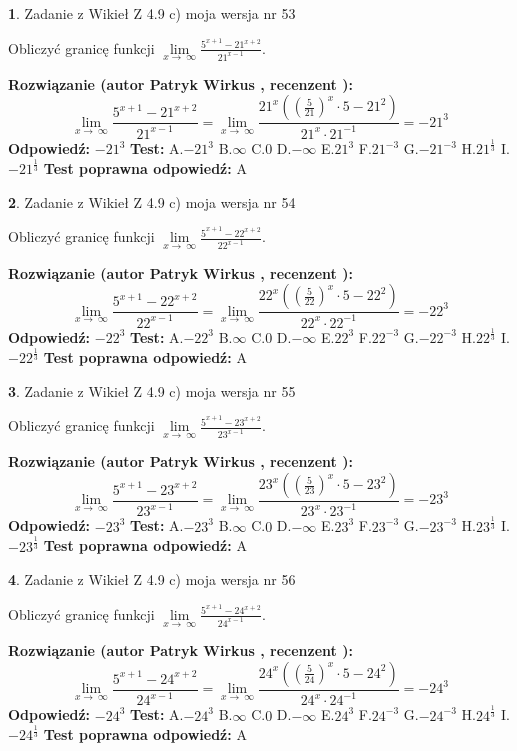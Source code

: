 \documentclass[12pt, a4paper]{article}
\theoremstyle{definition} %
\newtheorem{zad}{}
\newcommand{\zadStart}[1]{\begin{zad}#1\newline}
\newcommand{\zadStop}{\end{zad}}
\newcommand{\rozwStart}[2]{\noindent \textbf{Rozwiązanie (autor #1 , recenzent #2): }\newline}
\newcommand{\rozwStop}{\newline}
\newcommand{\odpStart}{\noindent \textbf{Odpowiedź:}\newline}
\newcommand{\odpStop}{\newline}
\newcommand{\testStart}{\noindent \textbf{Test:}\newline}
\newcommand{\testStop}{\newline}
\newcommand{\kluczStart}{\noindent \textbf{Test poprawna odpowiedź:}\newline}
\newcommand{\kluczStop}{\newline}
\begin{document}
\zadStart{Zadanie z Wikieł Z 4.9 c) moja wersja nr 53}


Obliczyć granicę funkcji  $\lim\limits_{x\to\ \infty}\frac{5^{x+1}-21^{x+2}}{21^{x-1}}$.
\zadStop
\rozwStart{Patryk Wirkus}{}
$$\lim\limits_{x\to\ \infty}\frac{5^{x+1}-21^{x+2}}{21^{x-1}}=\lim\limits_{x\to\ \infty}\frac{21^{x}((\frac{5}{21})^{x}\cdot 5 -21^{2})}{21^{x}\cdot 21^{-1}} = -21^{3}$$
\rozwStop
\odpStart
$-21^{3}$
\odpStop
\testStart
A.$-21^{3}$ B.$\infty$ C.$0$ D.$-\infty$ E.$21^{3}$
F.$21^{-3}$ G.$-21^{-3}$
H.$21^{\frac{1}{3}}$
I.$-21^{\frac{1}{3}}$
\testStop
\kluczStart
A
\kluczStop



\zadStart{Zadanie z Wikieł Z 4.9 c) moja wersja nr 54}


Obliczyć granicę funkcji  $\lim\limits_{x\to\ \infty}\frac{5^{x+1}-22^{x+2}}{22^{x-1}}$.
\zadStop
\rozwStart{Patryk Wirkus}{}
$$\lim\limits_{x\to\ \infty}\frac{5^{x+1}-22^{x+2}}{22^{x-1}}=\lim\limits_{x\to\ \infty}\frac{22^{x}((\frac{5}{22})^{x}\cdot 5 -22^{2})}{22^{x}\cdot 22^{-1}} = -22^{3}$$
\rozwStop
\odpStart
$-22^{3}$
\odpStop
\testStart
A.$-22^{3}$ B.$\infty$ C.$0$ D.$-\infty$ E.$22^{3}$
F.$22^{-3}$ G.$-22^{-3}$
H.$22^{\frac{1}{3}}$
I.$-22^{\frac{1}{3}}$
\testStop
\kluczStart
A
\kluczStop



\zadStart{Zadanie z Wikieł Z 4.9 c) moja wersja nr 55}


Obliczyć granicę funkcji  $\lim\limits_{x\to\ \infty}\frac{5^{x+1}-23^{x+2}}{23^{x-1}}$.
\zadStop
\rozwStart{Patryk Wirkus}{}
$$\lim\limits_{x\to\ \infty}\frac{5^{x+1}-23^{x+2}}{23^{x-1}}=\lim\limits_{x\to\ \infty}\frac{23^{x}((\frac{5}{23})^{x}\cdot 5 -23^{2})}{23^{x}\cdot 23^{-1}} = -23^{3}$$
\rozwStop
\odpStart
$-23^{3}$
\odpStop
\testStart
A.$-23^{3}$ B.$\infty$ C.$0$ D.$-\infty$ E.$23^{3}$
F.$23^{-3}$ G.$-23^{-3}$
H.$23^{\frac{1}{3}}$
I.$-23^{\frac{1}{3}}$
\testStop
\kluczStart
A
\kluczStop



\zadStart{Zadanie z Wikieł Z 4.9 c) moja wersja nr 56}


Obliczyć granicę funkcji  $\lim\limits_{x\to\ \infty}\frac{5^{x+1}-24^{x+2}}{24^{x-1}}$.
\zadStop
\rozwStart{Patryk Wirkus}{}
$$\lim\limits_{x\to\ \infty}\frac{5^{x+1}-24^{x+2}}{24^{x-1}}=\lim\limits_{x\to\ \infty}\frac{24^{x}((\frac{5}{24})^{x}\cdot 5 -24^{2})}{24^{x}\cdot 24^{-1}} = -24^{3}$$
\rozwStop
\odpStart
$-24^{3}$
\odpStop
\testStart
A.$-24^{3}$ B.$\infty$ C.$0$ D.$-\infty$ E.$24^{3}$
F.$24^{-3}$ G.$-24^{-3}$
H.$24^{\frac{1}{3}}$
I.$-24^{\frac{1}{3}}$
\testStop
\kluczStart
A
\kluczStop
\end{document}
